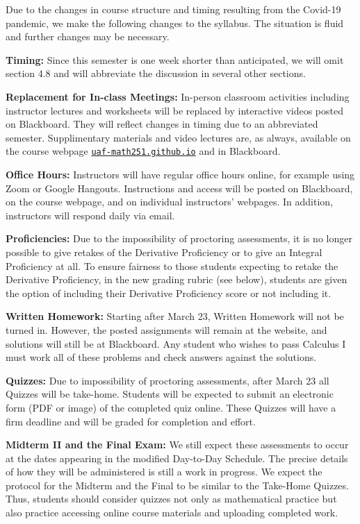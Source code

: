 \documentclass[12pt]{article}
\begin{document}
Due to the changes in course structure and timing resulting from the Covid-19 pandemic, we make the following changes to the syllabus.  The situation is fluid and further changes may be necessary.

\textbf{Timing:} Since this semester is one week shorter than anticipated, we will omit section 4.8 and will abbreviate the discussion in several other sections.

\textbf{Replacement for In-class Meetings:} In-person classroom activities including instructor lectures and worksheets will be replaced by interactive videos posted on Blackboard. They will reflect changes in timing due to an abbreviated semester. Supplimentary materials and video lectures are, as always, available on the course webpage \href{https://uaf-math251.github.io/}{\texttt{uaf-math251.github.io}} and in Blackboard.

\textbf{Office Hours:} Instructors will have regular office hours online, for example using Zoom or Google Hangouts. Instructions and access will be posted on Blackboard, on the course webpage, and on individual instructors' webpages.  In addition, instructors will respond daily via email.

\textbf{Proficiencies:} Due to the impossibility of proctoring assessments, it is no longer possible to give retakes of the Derivative Proficiency or to give an Integral Proficiency at all. To ensure fairness to those students expecting to retake the Derivative Proficiency, in the new grading rubric (see below), students are given the option of including their Derivative Proficiency score or not including it. 

\textbf{Written Homework:} Starting after March 23, Written Homework will not be turned in.  However, the posted assignments will remain at the website, and solutions will still be at Blackboard.  Any student who wishes to pass Calculus I must work all of these problems and check answers against the solutions.

\textbf{Quizzes:} Due to impossibility of proctoring assessments, after March 23 all Quizzes will be take-home.  Students will be expected to submit an electronic form (PDF or image) of the completed quiz online.  These Quizzes will have a firm deadline and will be graded for completion and effort.

\textbf{Midterm II and the Final Exam:} We still expect these assessments to occur at the dates appearing in the modified Day-to-Day Schedule. The precise details of how they will be administered is still a work in progress. We expect the protocol for the Midterm and the Final to be similar to the Take-Home Quizzes. Thus, students should consider quizzes not only as mathematical practice but also practice accessing online course materials and uploading completed work.
\end{document}
